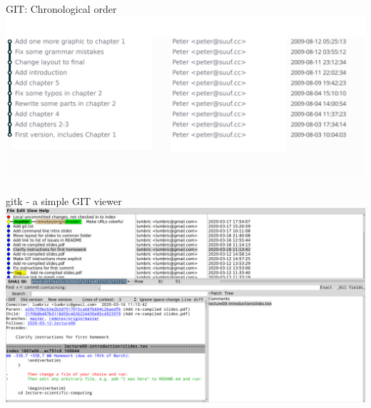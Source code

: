 \begin{frame}[fragile]{GIT: Chronological order}
    \includegraphics[width=\textwidth]{images/screenshot-ugly-filenames-4.png}
\end{frame}


\begin{frame}[fragile]{gitk - a simple GIT viewer}
    \includegraphics[width=\textwidth]{images/gitk-screenshot.png}
\end{frame}


